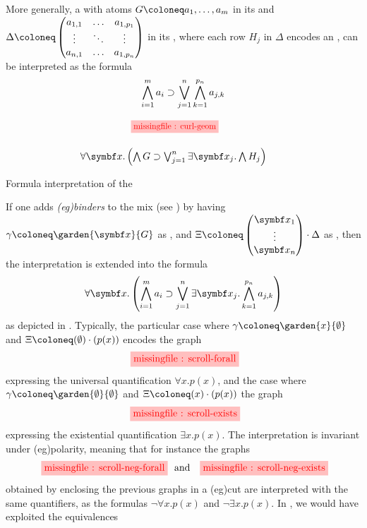 \begin{scope}
More generally, a  with atoms $G \deq a_1, \ldots, a_m$ in its
 and $\Delta \deq \begin{pmatrix} a_{1,1} & \ldots & a_{1,p_1} \\
  \vdots & \ddots & \vdots \\
  a_{n,1} & \ldots & a_{1,p_n}
\end{pmatrix}$
in its , where each row $H_j$ in $\Delta$ encodes an , can be
interpreted as the formula
$$\bigwedge_{i = 1}^{m}{a_i} \supset \bigvee_{j = 1}^{n}\bigwedge_{k = 1}^{p_n}{a_{j,k}}$$
\begin{marginfigure}
  $$
  \!\!\!\!
  \!\!\!\!
  \!\!\!\!
  \begin{array}{c}
    \tikzfig{0.85}{0.85}{curl-geom} \vspace{1.5em}\\
    \forall \bx. \left(\bigwedge G \limp \bigvee_{j = 1}^{n}\exists \bx_j. \bigwedge H_j\right)
  \end{array}
  $$
  \caption{Formula interpretation of the }
\end{marginfigure}
If one adds \emph{\kl(eg){binders}} to the mix (see ) by having $\gamma \deq
\garden{\bx}{G}$ as , and
$\Xi \deq \begin{pmatrix}
  \bx_1 \\
  \vdots \\
  \bx_n
\end{pmatrix} \cdot \Delta$ as , then the interpretation is extended into
the formula
$$\forall \bx. \left(\bigwedge_{i = 1}^{m}{a_i} \limp \bigvee_{j = 1}^{n}\exists \bx_j. \bigwedge_{k = 1}^{p_n}{a_{j,k}}\right)$$
as depicted in . Typically, the particular case where $\gamma
\deq \garden{x}{\emptyset}$ and $\Xi \deq (\emptyset) \cdot (p(x))$ encodes the graph
$$\stkfig{1}{scroll-forall}$$
expressing the universal quantification $\forall x. p(x)$, and the case where
$\gamma \deq \garden{\emptyset}{\emptyset}$ and $\Xi \deq (x) \cdot (p(x))$ the graph
$$\stkfig{1}{scroll-exists}$$
expressing the existential quantification $\exists x. p(x)$. The interpretation
is invariant under \kl(eg){polarity}, meaning that for instance the graphs
$$\stkfig{1}{scroll-neg-forall} \text{   and   } \stkfig{1}{scroll-neg-exists}$$
obtained by enclosing the previous graphs in a \kl(eg){cut} are interpreted with the
same quantifiers, as the formulas $\neg \forall x. p(x)$ and $\neg \exists x.
p(x)$. In , we would have exploited the  equivalences

\end{scope}
